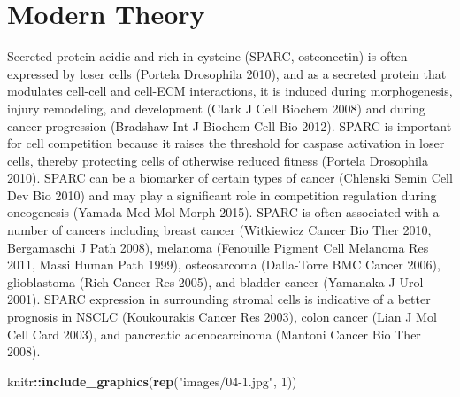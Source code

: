 \documentclass[]{book}
\newenvironment{Shaded}{\begin{snugshade}}{\end{snugshade}}
\newcommand{\KeywordTok}[1]{\textcolor[rgb]{0.13,0.29,0.53}{\textbf{#1}}}
\newcommand{\DecValTok}[1]{\textcolor[rgb]{0.00,0.00,0.81}{#1}}
\newcommand{\StringTok}[1]{\textcolor[rgb]{0.31,0.60,0.02}{#1}}
\newcommand{\OperatorTok}[1]{\textcolor[rgb]{0.81,0.36,0.00}{\textbf{#1}}}
\newcommand{\NormalTok}[1]{#1}
\begin{document}
\section{Modern Theory}\label{modern-theory}

Secreted protein acidic and rich in cysteine (SPARC, osteonectin) is
often expressed by loser cells (Portela Drosophila 2010), and as a
secreted protein that modulates cell-cell and cell-ECM interactions, it
is induced during morphogenesis, injury remodeling, and development
(Clark J Cell Biochem 2008) and during cancer progression (Bradshaw Int
J Biochem Cell Bio 2012). SPARC is important for cell competition
because it raises the threshold for caspase activation in loser cells,
thereby protecting cells of otherwise reduced fitness (Portela
Drosophila 2010). SPARC can be a biomarker of certain types of cancer
(Chlenski Semin Cell Dev Bio 2010) and may play a significant role in
competition regulation during oncogenesis (Yamada Med Mol Morph 2015).
SPARC is often associated with a number of cancers including breast
cancer (Witkiewicz Cancer Bio Ther 2010, Bergamaschi J Path 2008),
melanoma (Fenouille Pigment Cell Melanoma Res 2011, Massi Human Path
1999), osteosarcoma (Dalla-Torre BMC Cancer 2006), glioblastoma (Rich
Cancer Res 2005), and bladder cancer (Yamanaka J Urol 2001). SPARC
expression in surrounding stromal cells is indicative of a better
prognosis in NSCLC (Koukourakis Cancer Res 2003), colon cancer (Lian J
Mol Cell Card 2003), and pancreatic adenocarcinoma (Mantoni Cancer Bio
Ther 2008).

\begin{Shaded}
\begin{Highlighting}[]
\NormalTok{knitr}\OperatorTok{::}\KeywordTok{include_graphics}\NormalTok{(}\KeywordTok{rep}\NormalTok{(}\StringTok{"images/04-1.jpg"}\NormalTok{, }\DecValTok{1}\NormalTok{))}
\end{Highlighting}
\end{Shaded}
\end{document}
